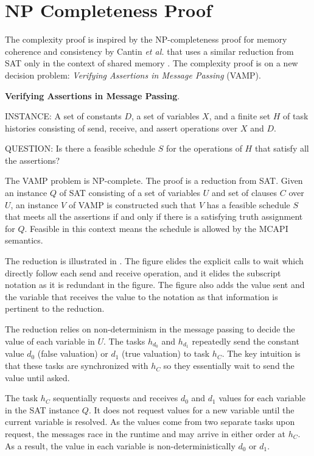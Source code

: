 \section{NP Completeness Proof}
The complexity proof is inspired by the NP-completeness proof for
memory coherence and consistency by Cantin \emph{et al.} that uses a
similar reduction from SAT only in the context of shared memory
\cite{Cantin:2005:CVM:1070608.1070722}. The complexity proof is on a
new decision problem: \emph{Verifying Assertions in Message Passing}
(VAMP).
\begin{definition}
\textbf{Verifying Assertions in Message Passing}.
\begin{compactdesc}
\item{INSTANCE}: A set of constants $D$, a set of variables $X$, and a
  finite set $H$ of task histories consisting of send, receive, and
  assert operations over $X$ and $D$.
\item{QUESTION}: Is there a feasible schedule $S$ for the operations
  of $H$ that satisfy all the assertions?
\end{compactdesc}
\label{def:np1}
\end{definition}

The VAMP problem is NP-complete. The proof is a reduction from
SAT. Given an instance $Q$ of SAT consisting of a set of variables $U$
and set of clauses $C$ over $U$, an instance $V$ of VAMP is
constructed such that $V$ has a feasible schedule $S$ that meets all
the assertions if and only if there is a satisfying truth assignment
for $Q$. Feasible in this context means the schedule is allowed by the
MCAPI semantics.

The reduction is illustrated in . The figure elides
the explicit calls to wait which directly follow each send and receive
operation, and it elides the subscript notation as it is redundant in
the figure. The figure also adds the value sent and the variable that
receives the value to the notation as that information is pertinent to
the reduction.

The reduction relies on non-determinism in the message passing to
decide the value of each variable in $U$.  The tasks $h_{d_0}$ and
$h_{d_1}$ repeatedly send the constant value $d_0$ (false valuation) or
$d_1$ (true valuation) to task $h_C$. The key intuition is that these
tasks are synchronized with $h_C$ so they essentially wait to send the
value until asked.

The task $h_C$ sequentially requests and receives $d_0$ and $d_1$
values for each variable in the SAT instance $Q$. It does not request
values for a new variable until the current variable is resolved. As
the values come from two separate tasks upon request, the messages
race in the runtime and may arrive in either order at $h_C$. As a
result, the value in each variable is non-deterministically $d_0$ or $d_1$.

